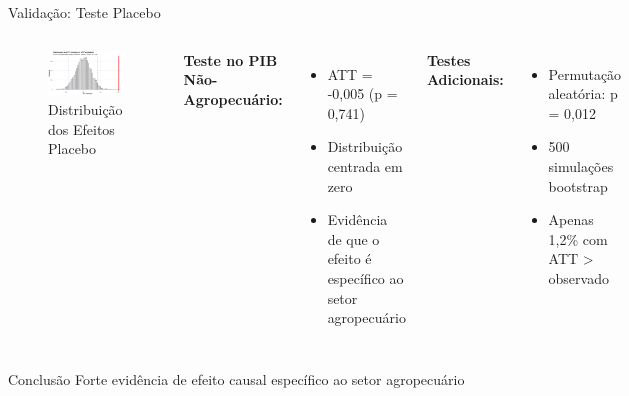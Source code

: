 \documentclass[10pt,aspectratio=169]{beamer}
\begin{document}
\begin{frame}{Validação: Teste Placebo}
\begin{columns}
\begin{figure}
\centering
\includegraphics[width=\textwidth]{../../../data/outputs/placebo_distribution.png}
\caption{Distribuição dos Efeitos Placebo}
\end{figure}

\textbf{Teste no PIB Não-Agropecuário:}
\begin{itemize}
    \item ATT = -0,005 (p = 0,741)
    \item Distribuição centrada em zero
    \item Evidência de que o efeito é específico ao setor agropecuário
\end{itemize}

\textbf{Testes Adicionais:}
\begin{itemize}
    \item Permutação aleatória: p = 0,012
    \item 500 simulações bootstrap
    \item Apenas 1,2\% com ATT > observado
\end{itemize}
\end{columns}

\begin{block}{Conclusão}
Forte evidência de efeito causal específico ao setor agropecuário
\end{block}
\end{frame}
\end{document}
